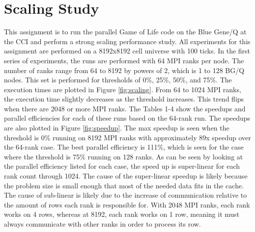\documentclass[11pt]{article}
\numberwithin{figure}{section}
\begin{document}

\maketitle

\section{Scaling Study}
This assignment is to run the parallel Game of Life code on the Blue Gene/Q at the CCI and perform a strong scaling performance study.  All experiments for this assignment are performed on a 8192x8192 cell universe with 100 ticks.   In the first series of experiments, the runs are performed with 64 MPI ranks per node.  The number of ranks range from 64 to 8192 by powers of 2, which is 1 to 128 BG/Q nodes.  This set is performed for thresholds of 0\%, 25\%, 50\%, and 75\%.  The execution times are plotted in Figure \ref{fig:scaling}.  From 64 to 1024 MPI ranks, the execution time slightly decreases as the threshold increases.  This trend flips when there are 2048 or more MPI ranks.  The  Tables 1-4 show the speedups and parallel efficiencies for each of these runs based on the 64-rank run.  The speedups are also plotted in Figure \ref{fig:speedup}.  The max speedup is seen when the threshold is 0\% running on 8192 MPI ranks with approximately 89x speedup over the 64-rank case.  The best parallel efficiency is 111\%, which is seen for the case where the threshold is 75\% running on 128 ranks.  As can be seen by looking at the parallel efficiency listed for each case, the speed up is super-linear for each rank count through 1024.  The cause of the super-linear speedup is likely because the problem size is small enough that most of the needed data fits in the cache.  The cause of sub-linear is likely due to the increase of communication relative to the amount of rows each rank is responsible for.  With 2048 MPI ranks, each rank works on 4 rows, whereas at 8192, each rank works on 1 row, meaning it must always communicate with other ranks in order to process its row.  
\end{document}
